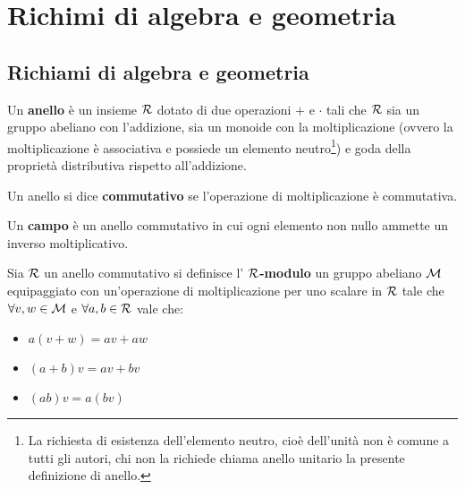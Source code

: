 
\chapter{Richimi di algebra e geometria}
\section{Richiami di algebra e geometria}

\begin{definition}
  Un \textbf{anello}  è un insieme $ \mathcal{R} $ dotato di due operazioni $ + $ e $ \cdot $ tali che
  $ \mathcal{R} $ sia un gruppo abeliano con l'addizione, sia un monoide con la moltiplicazione
  (ovvero la moltiplicazione è associativa e possiede un elemento neutro\footnote{La richiesta
    di esistenza dell'elemento neutro, cioè dell'unità non è comune a tutti gli autori,
    chi non la richiede chiama anello unitario  la presente
    definizione di anello.}) e goda della proprietà distributiva rispetto all'addizione.
\end{definition}

\begin{definition}
  Un anello si dice \textbf{commutativo}  se l'operazione di moltiplicazione
  è commutativa.
\end{definition}

\begin{definition}
  Un \textbf{campo}  è un anello commutativo in cui ogni elemento non nullo ammette
  un inverso moltiplicativo.
\end{definition}

\begin{definition}
  Sia $ \mathcal{R} $ un anello commutativo si definisce l' \textbf{$ \mathcal{R} $-modulo} 
  un gruppo abeliano $ \mathcal{M} $ equipaggiato con un'operazione di moltiplicazione per uno scalare in $ \mathcal{R} $
  tale che $ \forall v,w \in \mathcal{M} $ e $ \forall a,b \in \mathcal{R} $ vale che:
  \begin{itemize}
  \item $ a(v + w) = av + aw $
  \item $ (a + b)v = av + bv $
  \item $ (ab)v = a(bv) $
  \end{itemize}
\end{definition}

